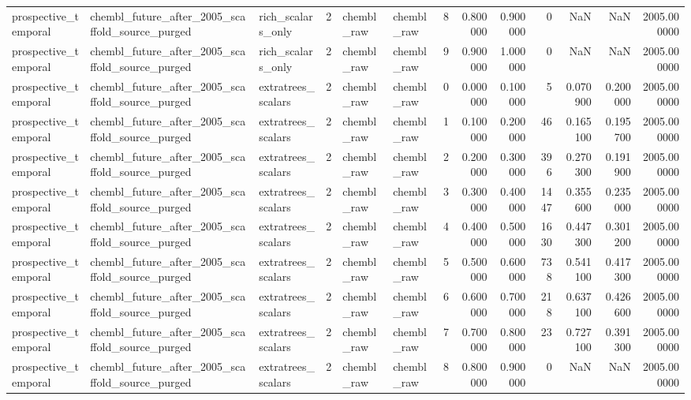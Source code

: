 \begin{longtable}{lllrllrrrrrrr}
prospective\_temporal & chembl\_future\_after\_2005\_scaffold\_source\_purged & rich\_scalars\_only & 2 & chembl\_raw & chembl\_raw & 8 & 0.800000 & 0.900000 & 0 & NaN & NaN & 2005.000000 \\
prospective\_temporal & chembl\_future\_after\_2005\_scaffold\_source\_purged & rich\_scalars\_only & 2 & chembl\_raw & chembl\_raw & 9 & 0.900000 & 1.000000 & 0 & NaN & NaN & 2005.000000 \\
prospective\_temporal & chembl\_future\_after\_2005\_scaffold\_source\_purged & extratrees\_scalars & 2 & chembl\_raw & chembl\_raw & 0 & 0.000000 & 0.100000 & 5 & 0.070900 & 0.200000 & 2005.000000 \\
prospective\_temporal & chembl\_future\_after\_2005\_scaffold\_source\_purged & extratrees\_scalars & 2 & chembl\_raw & chembl\_raw & 1 & 0.100000 & 0.200000 & 46 & 0.165100 & 0.195700 & 2005.000000 \\
prospective\_temporal & chembl\_future\_after\_2005\_scaffold\_source\_purged & extratrees\_scalars & 2 & chembl\_raw & chembl\_raw & 2 & 0.200000 & 0.300000 & 396 & 0.270300 & 0.191900 & 2005.000000 \\
prospective\_temporal & chembl\_future\_after\_2005\_scaffold\_source\_purged & extratrees\_scalars & 2 & chembl\_raw & chembl\_raw & 3 & 0.300000 & 0.400000 & 1447 & 0.355600 & 0.235000 & 2005.000000 \\
prospective\_temporal & chembl\_future\_after\_2005\_scaffold\_source\_purged & extratrees\_scalars & 2 & chembl\_raw & chembl\_raw & 4 & 0.400000 & 0.500000 & 1630 & 0.447300 & 0.301200 & 2005.000000 \\
prospective\_temporal & chembl\_future\_after\_2005\_scaffold\_source\_purged & extratrees\_scalars & 2 & chembl\_raw & chembl\_raw & 5 & 0.500000 & 0.600000 & 738 & 0.541100 & 0.417300 & 2005.000000 \\
prospective\_temporal & chembl\_future\_after\_2005\_scaffold\_source\_purged & extratrees\_scalars & 2 & chembl\_raw & chembl\_raw & 6 & 0.600000 & 0.700000 & 218 & 0.637100 & 0.426600 & 2005.000000 \\
prospective\_temporal & chembl\_future\_after\_2005\_scaffold\_source\_purged & extratrees\_scalars & 2 & chembl\_raw & chembl\_raw & 7 & 0.700000 & 0.800000 & 23 & 0.727100 & 0.391300 & 2005.000000 \\
prospective\_temporal & chembl\_future\_after\_2005\_scaffold\_source\_purged & extratrees\_scalars & 2 & chembl\_raw & chembl\_raw & 8 & 0.800000 & 0.900000 & 0 & NaN & NaN & 2005.000000 \\

\end{longtable}
